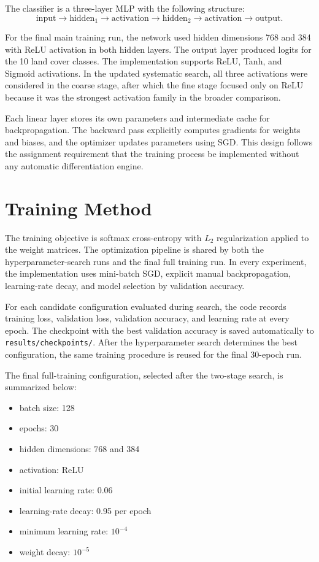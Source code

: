 \documentclass{article}
\begin{document}
The classifier is a three-layer MLP with the following structure:
\[
\text{input} \rightarrow \text{hidden}_1 \rightarrow \text{activation} \rightarrow \text{hidden}_2 \rightarrow \text{activation} \rightarrow \text{output}.
\]

For the final main training run, the network used hidden dimensions 768 and 384 with ReLU activation in both hidden layers. The output layer produced logits for the 10 land cover classes. The implementation supports ReLU, Tanh, and Sigmoid activations. In the updated systematic search, all three activations were considered in the coarse stage, after which the fine stage focused only on ReLU because it was the strongest activation family in the broader comparison.

Each linear layer stores its own parameters and intermediate cache for backpropagation. The backward pass explicitly computes gradients for weights and biases, and the optimizer updates parameters using SGD. This design follows the assignment requirement that the training process be implemented without any automatic differentiation engine.

\section{Training Method}

The training objective is softmax cross-entropy with \(L_2\) regularization applied to the weight matrices. The optimization pipeline is shared by both the hyperparameter-search runs and the final full training run. In every experiment, the implementation uses mini-batch SGD, explicit manual backpropagation, learning-rate decay, and model selection by validation accuracy.

For each candidate configuration evaluated during search, the code records training loss, validation loss, validation accuracy, and learning rate at every epoch. The checkpoint with the best validation accuracy is saved automatically to \texttt{results/checkpoints/}. After the hyperparameter search determines the best configuration, the same training procedure is reused for the final 30-epoch run.

The final full-training configuration, selected after the two-stage search, is summarized below:

\begin{itemize}
\item batch size: 128
\item epochs: 30
\item hidden dimensions: 768 and 384
\item activation: ReLU
\item initial learning rate: 0.06
\item learning-rate decay: 0.95 per epoch
\item minimum learning rate: \(10^{-4}\)
\item weight decay: \(10^{-5}\)
\end{itemize}
\end{document}
